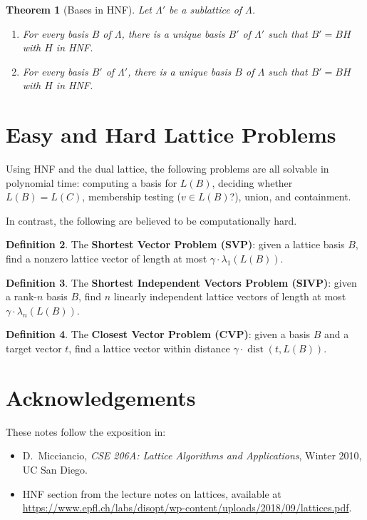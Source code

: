 \documentclass[11pt]{article}
\theoremstyle{plain}
\newtheorem{theorem}{Theorem}[section]
\theoremstyle{definition}
\newtheorem{definition}[theorem]{Definition}
\begin{document}
\begin{theorem}[Bases in HNF]
Let $\Lambda'$ be a sublattice of $\Lambda$.
\begin{enumerate}[label=(\alph*)]
  \item For every basis $B$ of $\Lambda$, there is a unique basis $B'$ of $\Lambda'$ such that $B' = BH$ with $H$ in HNF.
  \item For every basis $B'$ of $\Lambda'$, there is a unique basis $B$ of $\Lambda$ such that $B' = BH$ with $H$ in HNF.
\end{enumerate}
\end{theorem}

\section{Easy and Hard Lattice Problems}

Using HNF and the dual lattice, the following problems are all solvable in polynomial time: computing a basis for $L(B)$, deciding whether $L(B) = L(C)$, membership testing ($v \in L(B)$?), union, and containment.

In contrast, the following are believed to be computationally hard.

\begin{definition}
The \textbf{Shortest Vector Problem (SVP)}: given a lattice basis $B$, find a nonzero lattice vector of length at most $\gamma \cdot \lambda_1(L(B))$.
\end{definition}

\begin{definition}
The \textbf{Shortest Independent Vectors Problem (SIVP)}: given a rank-$n$ basis $B$, find $n$ linearly independent lattice vectors of length at most $\gamma \cdot \lambda_n(L(B))$.
\end{definition}

\begin{definition}
The \textbf{Closest Vector Problem (CVP)}: given a basis $B$ and a target vector $t$, find a lattice vector within distance $\gamma \cdot \operatorname{dist}(t, L(B))$.
\end{definition}

\section*{Acknowledgements}

These notes follow the exposition in:
\begin{itemize}
  \item D.~Micciancio, \textit{CSE 206A: Lattice Algorithms and Applications}, 
        Winter 2010, UC San Diego.
  \item HNF section from the lecture notes on lattices, available at 
        \url{https://www.epfl.ch/labs/disopt/wp-content/uploads/2018/09/lattices.pdf}.
\end{itemize}
\end{document}
